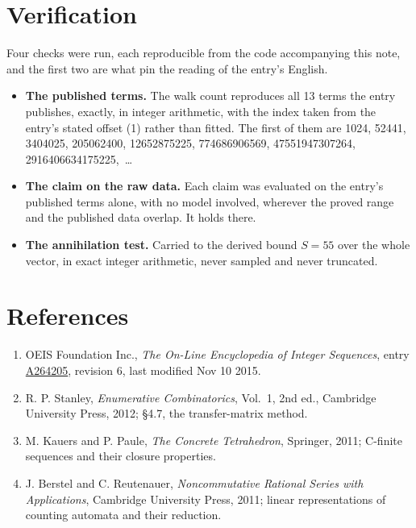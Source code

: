 \documentclass[11pt]{article}
\theoremstyle{definition}
\begin{document}
\section{Verification}

Four checks were run, each reproducible from the code accompanying this note, and the first two are what pin the reading of the entry's English.

\begin{itemize}

\item {\bfseries The published terms.} The walk count reproduces all 13 terms the entry publishes, exactly, in integer arithmetic, with the index taken from the entry's stated offset (1) rather than fitted. The first of them are 1024, 52441, 3404025, 205062400, 12652875225, 774686906569, 47551947307264, 2916406634175225,~\dots

\item {\bfseries The claim on the raw data.} Each claim was evaluated on the entry's published terms alone, with no model involved, wherever the proved range and the published data overlap. It holds there.

\item {\bfseries The annihilation test.} Carried to the derived bound $S = 55$ over the whole vector, in exact integer arithmetic, never sampled and never truncated.

\end{itemize}

\section{References}

\begin{enumerate}

\item OEIS Foundation Inc., \emph{The On-Line Encyclopedia of Integer Sequences}, entry \href{https://oeis.org/A264205}{A264205}, revision 6, last modified Nov 10 2015.

\item R. P. Stanley, \emph{Enumerative Combinatorics}, Vol.~1, 2nd ed., Cambridge University Press, 2012; \S4.7, the transfer-matrix method.

\item M. Kauers and P. Paule, \emph{The Concrete Tetrahedron}, Springer, 2011; C-finite sequences and their closure properties.

\item J. Berstel and C. Reutenauer, \emph{Noncommutative Rational Series with Applications}, Cambridge University Press, 2011; linear representations of counting automata and their reduction.

\end{enumerate}
\end{document}
